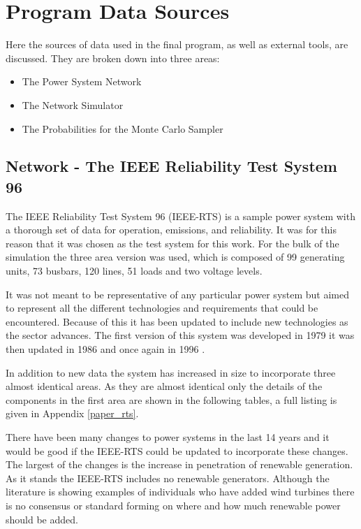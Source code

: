\documentclass[a4paper,oneside,12pt]{report}
\begin{document}
\section{Program Data Sources}

Here the sources of data used in the final program, as well as external tools, are discussed. They are broken down into three areas:

\begin{itemize}
\item The Power System Network
\item The Network Simulator
\item The Probabilities for the Monte Carlo Sampler
\end{itemize}

\subsection{Network - The IEEE Reliability Test System 96\label{lbl_RTS}}

The IEEE Reliability Test System 96 (IEEE-RTS) \cite{Grigg1999} is a sample power system with a thorough set of data for operation, emissions, and reliability. It was for this reason that it was chosen as the test system for this work. For the bulk of the simulation the three area version was used, which is composed of 99 generating units, 73 busbars, 120 lines, 51 loads and two voltage levels.

It was not meant to be representative of any particular power system but aimed to represent all the different technologies and requirements that could be encountered. Because of this it has been updated to include new technologies as the sector advances. The first version of this system was developed in 1979 \cite{IEEERTSTaskForceofAPMSubcommittee1979} it was then updated in 1986 \cite{Allan1986} and once again in 1996 \cite{Grigg1999}.

In addition to new data the system has increased in size to incorporate three almost identical areas. As they are almost identical only the details of the components in the first area are shown in the following tables, a full listing is given in Appendix \ref{paper_rts}.

There have been many changes to power systems in the last 14 years and it would be good if the IEEE-RTS could be updated to incorporate these changes. The largest of the changes is the increase in penetration of renewable generation. As it stands the IEEE-RTS includes no renewable generators. Although the literature is showing examples of individuals who have added wind turbines there is no consensus or standard forming on where and how much renewable power should be added.
\end{document}
